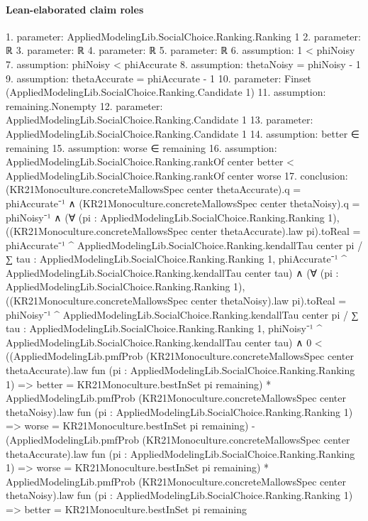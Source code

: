 \documentclass[10pt]{article}
\begin{document}
\paragraph{Lean-elaborated claim roles}\begin{ReviewVerbatim}
1. parameter: AppliedModelingLib.SocialChoice.Ranking.Ranking 1
2. parameter: ℝ
3. parameter: ℝ
4. parameter: ℝ
5. parameter: ℝ
6. assumption: 1 < phiNoisy
7. assumption: phiNoisy < phiAccurate
8. assumption: thetaNoisy = phiNoisy - 1
9. assumption: thetaAccurate = phiAccurate - 1
10. parameter: Finset (AppliedModelingLib.SocialChoice.Ranking.Candidate 1)
11. assumption: remaining.Nonempty
12. parameter: AppliedModelingLib.SocialChoice.Ranking.Candidate 1
13. parameter: AppliedModelingLib.SocialChoice.Ranking.Candidate 1
14. assumption: better ∈ remaining
15. assumption: worse ∈ remaining
16. assumption: AppliedModelingLib.SocialChoice.Ranking.rankOf center better <
  AppliedModelingLib.SocialChoice.Ranking.rankOf center worse
17. conclusion: (KR21Monoculture.concreteMallowsSpec center thetaAccurate).q = phiAccurate⁻¹ ∧
  (KR21Monoculture.concreteMallowsSpec center thetaNoisy).q = phiNoisy⁻¹ ∧
    (∀ (pi : AppliedModelingLib.SocialChoice.Ranking.Ranking 1),
        ((KR21Monoculture.concreteMallowsSpec center thetaAccurate).law pi).toReal =
          phiAccurate⁻¹ ^ AppliedModelingLib.SocialChoice.Ranking.kendallTau center pi /
            ∑ tau : AppliedModelingLib.SocialChoice.Ranking.Ranking 1,
              phiAccurate⁻¹ ^ AppliedModelingLib.SocialChoice.Ranking.kendallTau center tau) ∧
      (∀ (pi : AppliedModelingLib.SocialChoice.Ranking.Ranking 1),
          ((KR21Monoculture.concreteMallowsSpec center thetaNoisy).law pi).toReal =
            phiNoisy⁻¹ ^ AppliedModelingLib.SocialChoice.Ranking.kendallTau center pi /
              ∑ tau : AppliedModelingLib.SocialChoice.Ranking.Ranking 1,
                phiNoisy⁻¹ ^ AppliedModelingLib.SocialChoice.Ranking.kendallTau center tau) ∧
        0 <
          ((AppliedModelingLib.pmfProb (KR21Monoculture.concreteMallowsSpec center thetaAccurate).law
                fun (pi : AppliedModelingLib.SocialChoice.Ranking.Ranking 1) =>
                better = KR21Monoculture.bestInSet pi remaining) *
              AppliedModelingLib.pmfProb (KR21Monoculture.concreteMallowsSpec center thetaNoisy).law
                fun (pi : AppliedModelingLib.SocialChoice.Ranking.Ranking 1) =>
                worse = KR21Monoculture.bestInSet pi remaining) -
            (AppliedModelingLib.pmfProb (KR21Monoculture.concreteMallowsSpec center thetaAccurate).law
                fun (pi : AppliedModelingLib.SocialChoice.Ranking.Ranking 1) =>
                worse = KR21Monoculture.bestInSet pi remaining) *
              AppliedModelingLib.pmfProb (KR21Monoculture.concreteMallowsSpec center thetaNoisy).law
                fun (pi : AppliedModelingLib.SocialChoice.Ranking.Ranking 1) =>
                better = KR21Monoculture.bestInSet pi remaining
\end{ReviewVerbatim}
\end{document}

